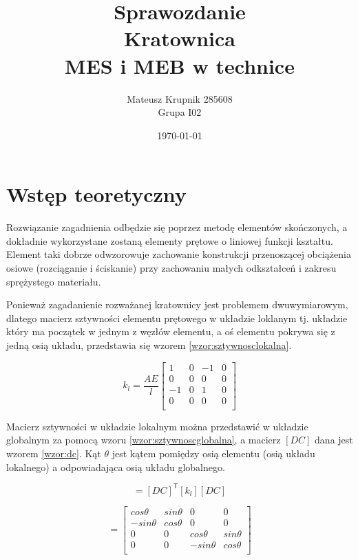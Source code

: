 \documentclass[12pt, a4papper, twoside]{article}
\title{Sprawozdanie \\ Kratownica\\ MES i MEB w technice}
\author{Mateusz Krupnik 285608 \\ Grupa I02 }
\date{\today}
\begin{document}
\maketitle
\newpage
\tableofcontents
\newpage

\section{Wstęp teoretyczny}
\label{sec:wstep}

Rozwiązanie zagadnienia odbędzie się poprzez metodę elementów skończonych, a dokładnie wykorzystane zostaną elementy prętowe o liniowej funkcji kształtu. Element taki dobrze odwzorowuje zachowanie konstrukcji przenoszącej obciążenia osiowe (rozciąganie i ściskanie) przy zachowaniu małych odkształceń i zakresu sprężystego materiału.

Ponieważ zagadanienie rozważanej kratownicy jest problemem dwuwymiarowym, dlatego macierz sztywności elementu prętowego w układzie loklanym tj. układzie który ma początek w jednym z węzłów elementu, a oś elementu pokrywa się z jedną osią układu, przedstawia się wzorem \ref{wzor:sztywnosclokalna}.

\begin{equation}
   k_{l} = \frac{AE}{l} \begin{bmatrix}
    1       & 0 & -1 &  0 \\
    0       & 0 & 0 &  0 \\
    -1       & 0 & 1 &  0 \\
    0      & 0 & 0 &  0 \\
\end{bmatrix}
    \label{wzor:sztywnosclokalna}
\end{equation}

Macierz sztywności w układzie lokalnym można przedstawić w układzie globalnym za pomocą wzoru \ref{wzor:sztywnoscglobalna}, a macierz $[DC]$ dana jest wzorem \ref{wzor:dc}. Kąt $\theta$ jest kątem pomiędzy osią elementu (osią układu lokalnego) a odpowiadająca osią układu globalnego.

\begin{equation}
   [k_{g}] = [DC]^\mathsf{T}[k_{l}][DC]
    \label{wzor:sztywnoscglobalna}
\end{equation}

\begin{equation}
   [DC] = \begin{bmatrix}
    cos\theta      & sin\theta & 0 &  0 \\
    -sin\theta      & cos\theta & 0 &  0 \\
    0       & 0 & cos\theta &  sin\theta \\
    0      & 0 & -sin\theta &  cos\theta \\
\end{bmatrix}
    \label{wzor:dc}
\end{equation}
\end{document}
